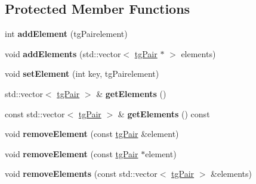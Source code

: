 \subsection*{Protected Member Functions}
\begin{DoxyCompactItemize}
\item 
\hypertarget{classtg_taggables_a1ec887791db68183f81e07b173191885}{int {\bfseries add\-Element} (tg\-Pairelement)}\label{classtg_taggables_a1ec887791db68183f81e07b173191885}

\item 
\hypertarget{classtg_taggables_a74a6535cefcc552eb7edf330908526b1}{void {\bfseries add\-Elements} (std\-::vector$<$ \hyperlink{classtg_pair}{tg\-Pair} $\ast$ $>$ elements)}\label{classtg_taggables_a74a6535cefcc552eb7edf330908526b1}

\item 
\hypertarget{classtg_taggables_a67f59350e693840f529b1296d6dce24e}{void {\bfseries set\-Element} (int key, tg\-Pairelement)}\label{classtg_taggables_a67f59350e693840f529b1296d6dce24e}

\item 
\hypertarget{classtg_taggables_a84d597b78dd84f0b283fcc29a7d6870e}{std\-::vector$<$ \hyperlink{classtg_pair}{tg\-Pair} $>$ \& {\bfseries get\-Elements} ()}\label{classtg_taggables_a84d597b78dd84f0b283fcc29a7d6870e}

\item 
\hypertarget{classtg_taggables_aa02f05de49b941454ced7b9acc9be80e}{const std\-::vector$<$ \hyperlink{classtg_pair}{tg\-Pair} $>$ \& {\bfseries get\-Elements} () const}\label{classtg_taggables_aa02f05de49b941454ced7b9acc9be80e}

\item 
\hypertarget{classtg_taggables_a15e9f671d96021a4f6a05d1c19eed441}{void {\bfseries remove\-Element} (const \hyperlink{classtg_pair}{tg\-Pair} \&element)}\label{classtg_taggables_a15e9f671d96021a4f6a05d1c19eed441}

\item 
\hypertarget{classtg_taggables_a6b5950b18acd5905dfbed9d97ac7dc82}{void {\bfseries remove\-Element} (const \hyperlink{classtg_pair}{tg\-Pair} $\ast$element)}\label{classtg_taggables_a6b5950b18acd5905dfbed9d97ac7dc82}

\item 
\hypertarget{classtg_taggables_a5539a39d29b42ce2770b106cd7ddd38e}{void {\bfseries remove\-Elements} (const std\-::vector$<$ \hyperlink{classtg_pair}{tg\-Pair} $>$ \&elements)}\label{classtg_taggables_a5539a39d29b42ce2770b106cd7ddd38e}


\end{DoxyCompactItemize}
